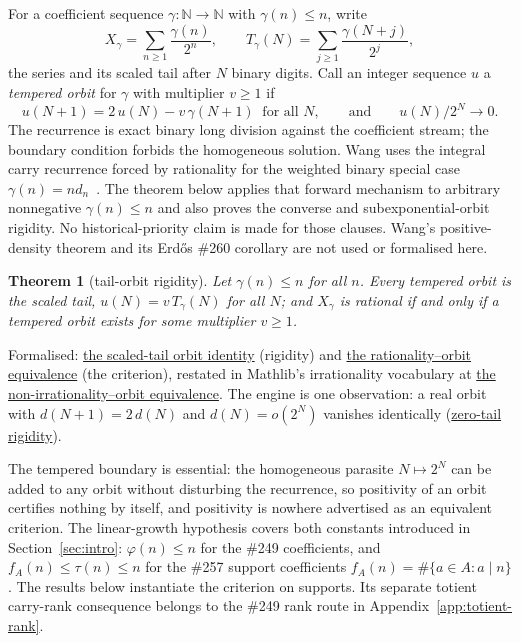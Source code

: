 \documentclass[11pt]{article}
\newcommand{\commit}{312b96c0d149ed466725c62d4ef24cfc91bca34e}
\newcommand{\repobase}{https://github.com/wcook04/plectis-lean-erdos249-257/blob/\commit}
\newcommand{\PK}{Erdos249257}
\newcommand{\lword}[4]{\href{\repobase/\PK/#1\#L#2}{#4}}
\newtheorem{theorem}{Theorem}[section]
\theoremstyle{definition}
\theoremstyle{remark}
\newcommand{\N}{\mathbb{N}}
\newcommand{\ph}{\varphi}
\begin{document}
For a coefficient sequence $\gamma:\N\to\N$ with $\gamma(n)\le n$, write
\[
X_\gamma=\sum_{n\ge1}\frac{\gamma(n)}{2^n},
\qquad
T_\gamma(N)=\sum_{j\ge1}\frac{\gamma(N+j)}{2^j},
\]
the series and its scaled tail after $N$ binary digits. Call an integer
sequence $u$ a \emph{tempered orbit} for $\gamma$ with multiplier $v\ge1$ if
\[
u(N+1)=2\,u(N)-v\,\gamma(N+1)\ \text{ for all } N,
\qquad\text{and}\qquad
u(N)/2^N\to0 .
\]
The recurrence is exact binary long division against the coefficient stream;
the boundary condition forbids the homogeneous solution. Wang uses the
integral carry recurrence forced by rationality for the weighted binary
special case $\gamma(n)=n d_n$~\cite[Section~3]{wang2026}. The theorem below applies that
forward mechanism to arbitrary nonnegative $\gamma(n)\le n$ and also proves
the converse and subexponential-orbit rigidity.  No historical-priority claim
is made for those clauses. Wang's positive-density theorem and its Erd\H{o}s
\#260 corollary are not used or formalised here.

\begin{theorem}[tail-orbit rigidity]\label{res:rigidity}
Let $\gamma(n)\le n$ for all $n$. Every tempered orbit is the scaled tail,
$u(N)=v\,T_\gamma(N)$ for all $N$; and $X_\gamma$ is rational if and only if a tempered
orbit exists for some multiplier $v\ge1$.
\end{theorem}
\noindent Formalised:
\lword{GenericTailOrbitRigidity.lean}{339}{temperedBinaryOrbit_eq_scaledTail}{the scaled-tail orbit identity}
(rigidity) and
\lword{GenericTailOrbitRigidity.lean}{426}{binaryCoeffSeries_rational_iff_exists_temperedBinaryOrbit}{the rationality--orbit equivalence}
(the criterion), restated in Mathlib's irrationality vocabulary at
\lword{GenericTailOrbitRigidity.lean}{435}{not_irrational_binaryCoeffSeries_iff_exists_temperedBinaryOrbit}{the non-irrationality--orbit equivalence}.
The engine is one observation: a real orbit with $d(N+1)=2\,d(N)$ and
$d(N)=o(2^N)$ vanishes identically
(\lword{GenericTailOrbitRigidity.lean}{315}{doublingOrbit_eq_zero_of_tempered}{zero-tail rigidity}).

The tempered boundary is essential: the
homogeneous parasite $N\mapsto2^N$ can be added to any orbit without
disturbing the recurrence, so positivity of an orbit certifies nothing by
itself, and positivity is nowhere advertised as an equivalent criterion. The
linear-growth hypothesis covers both constants introduced in
Section~\ref{sec:intro}:
$\ph(n)\le n$ for the \#249 coefficients, and $f_A(n)\le\tau(n)\le n$ for the
\#257 support coefficients $f_A(n)=\#\{a\in A:a\mid n\}$.  The results below
instantiate the criterion on supports.  Its separate totient
carry-rank consequence belongs to the \#249 rank route in
Appendix~\ref{app:totient-rank}.
\end{document}
